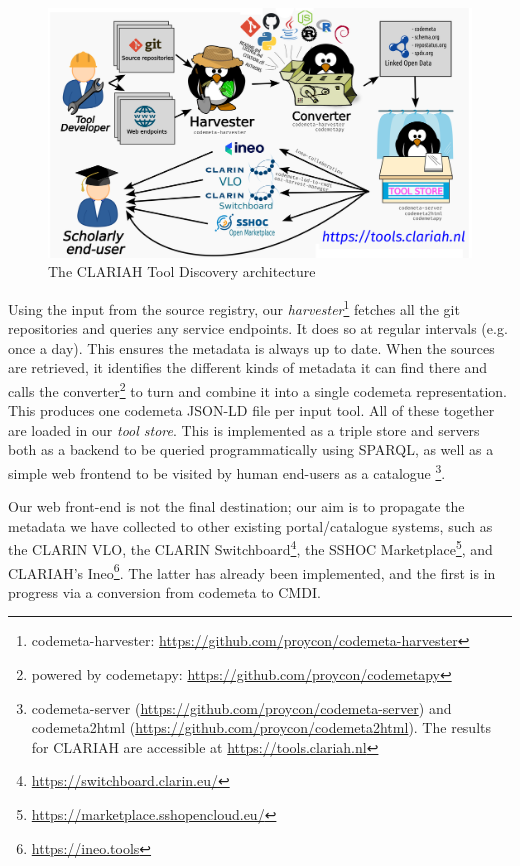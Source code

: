 \documentclass[a4paper,11pt]{article}
\begin{document}
\begin{figure}[h]
\begin{center}
\includegraphics[width=14.0cm]{architecture.png}
\caption{The CLARIAH Tool Discovery architecture}
\end{center}
\label{fig:architecture}
\end{figure}

Using the input from the source registry, our
\emph{harvester}\footnote{codemeta-harvester:
\url{https://github.com/proycon/codemeta-harvester}} fetches all the git
repositories and queries any service endpoints. It does so at regular intervals
(e.g. once a day). This ensures the metadata is always up to date. When the
sources are retrieved, it identifies the different kinds of metadata it can
find there and calls the converter\footnote{powered by codemetapy:
\url{https://github.com/proycon/codemetapy}} to turn and combine it into a
single codemeta representation. This produces one codemeta JSON-LD file per
input tool. All of these together are loaded in our \emph{tool store}. This is
implemented as a triple store and servers both as a backend to be queried
programmatically using SPARQL, as well as a simple web frontend to be visited by
human end-users as a catalogue \footnote{codemeta-server
(\url{https://github.com/proycon/codemeta-server}) and codemeta2html
(\url{https://github.com/proycon/codemeta2html}). The results for CLARIAH are
accessible at \url{https://tools.clariah.nl}}.

Our web front-end is not the final destination; our aim is to propagate the
metadata we have collected to other existing portal/catalogue systems, such as
the CLARIN VLO, the CLARIN
Switchboard\footnote{\url{https://switchboard.clarin.eu/}}, the SSHOC
Marketplace\footnote{\url{https://marketplace.sshopencloud.eu/}}, and CLARIAH's
Ineo\footnote{\url{https://ineo.tools}}. The latter has already been implemented, 
and the first is in progress via a conversion from codemeta to CMDI.
\end{document}
